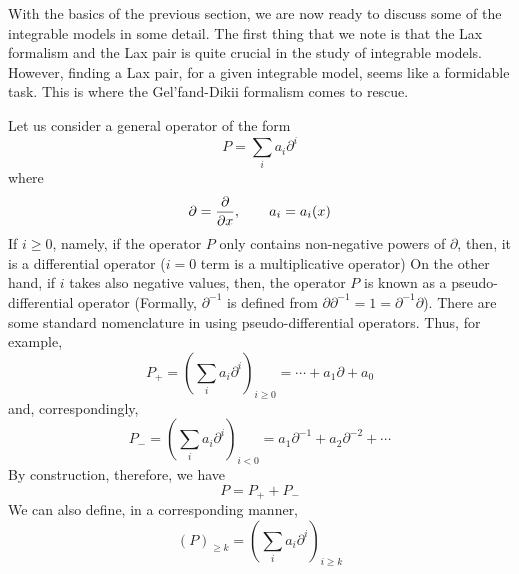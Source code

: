 \documentclass[a4paper,11pt]{article}
\begin{document}
With the basics of the previous section, we are now ready to discuss
some of the integrable models in some detail. The first thing that we
note is that the Lax formalism and the Lax pair is quite crucial in
the study of integrable models. However, finding a Lax pair, for a
given integrable model, seems like a formidable task. This is where
the Gel'fand-Dikii formalism comes to rescue.

Let us consider a general operator of the form
\begin{equation}
P = \sum_{i} a_{i} \partial^{i}
\end{equation}
where
\begin{equation}
\partial = {\partial\over \partial x},\qquad a_{i} = a_{i} (x)
\end{equation}
If $i\geq 0$, namely, if the operator $P$ only contains non-negative
powers of $\partial$, then, it is a differential operator ($i=0$ term
is a multiplicative operator) On the other hand, if $i$ takes also
negative values, then, the operator $P$ is known as a
pseudo-differential operator (Formally, $\partial^{-1}$ is defined
from $\partial \partial^{-1} = 1 = \partial^{-1}\partial$). There are
some standard nomenclature in using pseudo-differential
operators. Thus, for example,
\begin{equation}
P_{+} = \left(\sum_{i} a_{i} \partial^{i}\right)_{i \geq 0} = \cdots +
a_{1} \partial + a_{0}
\end{equation}
and, correspondingly,
\begin{equation}
P_{-} = \left(\sum_{i} a_{i} \partial^{i}\right)_{i < 0} = a_{1}
\partial^{-1} + a_{2} \partial^{-2} + \cdots
\end{equation}
By construction, therefore, we have
\begin{equation}
P = P_{+} + P_{-}
\end{equation}
We can also define, in a corresponding manner,
\begin{equation}
\left(P\right)_{\geq k} = \left(\sum_{i} a_{i}
\partial^{i}\right)_{i\geq k}
\end{equation}
\end{document}
